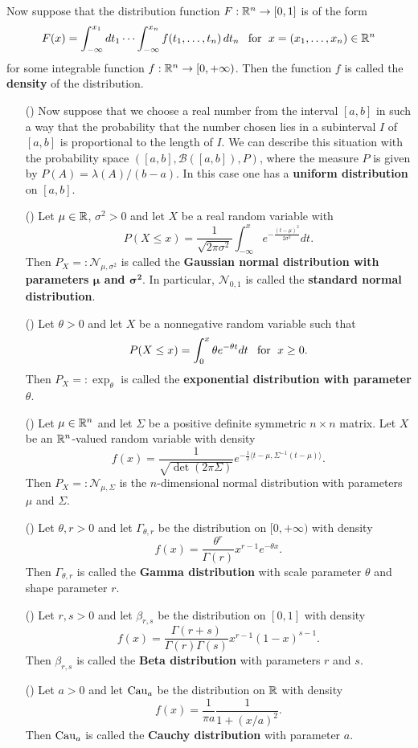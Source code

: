 \begin{definition}
Now suppose that the distribution function $F:\mathbb{R}^n\to[0,1]$ is of the form
\[F(x)=\int_{-\infty}^{x_1}dt_1\cdots\int_{-\infty}^{x_n}f(t_1,\dots,t_n)\,dt_n\hspace{8pt}\text{for}\hspace{6pt} x=(x_1,\dots,x_n)\in\mathbb{R}^n\]
for some integrable function $f:\mathbb{R}^n\to[0,+\infty)$. Then the function $f$ is called the \textbf{density} of the distribution.
\end{definition}
\begin{example}
\mbox{}
\begin{itemize}
\item[(\rmnum{1})] Now suppose that we choose a real number from the interval $[a,b]$ in such a way that the probability that the number chosen lies in a subinterval $I$ of $[a,b]$ is proportional to the length of $I$. We can describe this situation with the probability space $([a,b],\mathcal{B}([a,b]),P)$, where the measure $P$ is given by $P(A)=\lambda(A)/(b-a)$. In this case one has a \textbf{uniform distribution} on $[a,b]$.
\item[(\rmnum{2})] Let $\mu\in\mathbb{R}$, $\sigma^2>0$ and let $X$ be a real random variable with 
\[P(X\leq x)=\frac{1}{\sqrt{2\pi\sigma^2}}\int_{-\infty}^{x}e^{-\frac{(t-\mu)^2}{2\sigma^2}}dt.\]
Then $P_X=:\mathcal{N}_{\mu,\sigma^2}$ is called the \textbf{Gaussian normal distribution with parameters $\bm{\mu}$ and $\bm{\sigma^2}$}. In particular, $\mathcal{N}_{0,1}$ is called the \textbf{standard normal distribution}.
\item[(\rmnum{3})] Let $\theta>0$ and let $X$ be a nonnegative random variable such that
\[P(X\leq x)=\int_{0}^{x}\theta e^{-\theta t}dt\hspace{8pt}\text{for}\hspace{6pt} x\geq 0.\]
Then $P_X=:\exp_\theta$ is called the \textbf{exponential distribution with parameter $\theta$}.
\item[(\rmnum{4})] Let $\mu\in\mathbb{R}^n$ and let $\Sigma$ be a positive definite symmetric $n\times n$ matrix. Let $X$ be an $\mathbb{R}^n$-valued random variable with density
\[f(x)=\frac{1}{\sqrt{\det(2\pi\Sigma)}}e^{-\frac{1}{2}\langle t-\mu,\Sigma^{-1}(t-\mu)\rangle}.\]
Then $P_X=:\mathcal{N}_{\mu,\Sigma}$ is the $n$-dimensional normal distribution with parameters $\mu$ and $\Sigma$.
\item[(\rmnum{5})] Let $\theta,r>0$ and let $\Gamma_{\theta,r}$ be the distribution on $[0,+\infty)$ with density
\[f(x)=\frac{\theta^r}{\Gamma(r)}x^{r-1}e^{-\theta x}.\]
Then $\Gamma_{\theta,r}$ is called the \textbf{Gamma distribution} with scale parameter $\theta$ and shape parameter $r$.
\item[(\rmnum{6})] Let $r,s>0$ and let $\beta_{r,s}$ be the distribution on $[0,1]$ with density
\[f(x)=\frac{\Gamma(r+s)}{\Gamma(r)\Gamma(s)}x^{r-1}(1-x)^{s-1}.\]
Then $\beta_{r,s}$ is called the \textbf{Beta distribution} with parameters $r$ and $s$.
\item[(\rmnum{7})] Let $a>0$ and let $\mathrm{Cau}_a$ be the distribution on $\mathbb{R}$ with density
\[f(x)=\frac{1}{\pi a}\frac{1}{1+(x/a)^2}.\]
Then $\mathrm{Cau}_a$ is called the \textbf{Cauchy distribution} with parameter $a$.
\end{itemize}
\end{example}
